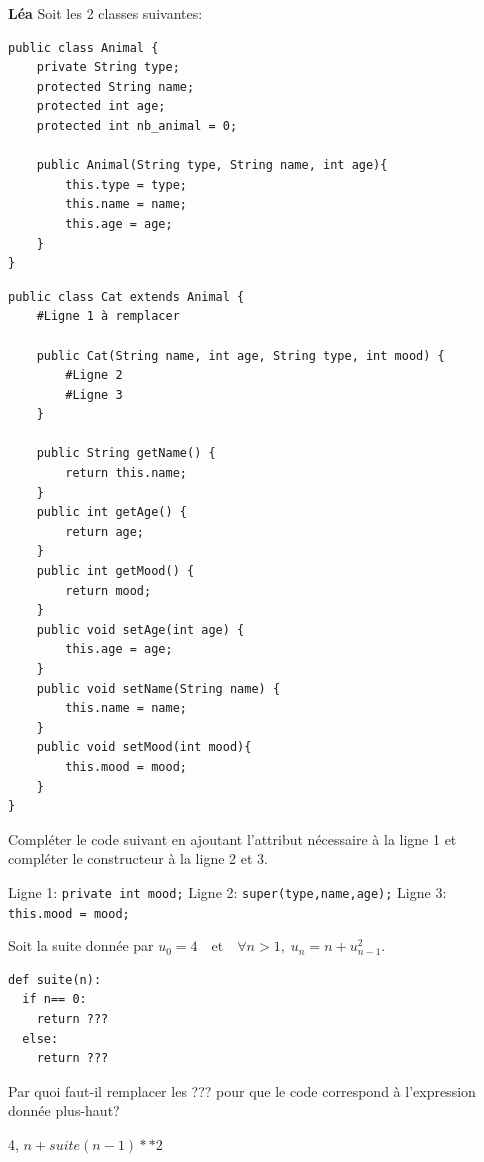 \begin{Exercice}[5 minutes]\textbf{Léa}
Soit les 2 classes suivantes:

\begin{lstlisting}[style=javastyle]
public class Animal {
    private String type;
    protected String name;
    protected int age;
    protected int nb_animal = 0;

    public Animal(String type, String name, int age){
        this.type = type;
        this.name = name;
        this.age = age;
    }
}
\end{lstlisting}

\begin{lstlisting}[style=javastyle]
public class Cat extends Animal {
    #Ligne 1 à remplacer

    public Cat(String name, int age, String type, int mood) {
        #Ligne 2
        #Ligne 3
    }

    public String getName() {
        return this.name;
    }
    public int getAge() {
        return age;
    }
    public int getMood() {
        return mood;
    }
    public void setAge(int age) {
        this.age = age;
    }
    public void setName(String name) {
        this.name = name;
    }
    public void setMood(int mood){
        this.mood = mood;
    }
}
\end{lstlisting}

Compléter le code suivant en ajoutant l'attribut nécessaire à la ligne 1 et compléter le constructeur à la ligne 2 et 3.

\begin{solution}
Ligne 1: \texttt{private int mood;} \newline 
Ligne 2: \texttt{super(type,name,age);} \newline 
Ligne 3: \texttt{this.mood = mood;}
\end{solution}


Soit la suite donnée par $u_0 = 4 \quad \text{et} \quad \forall n > 1,\; u_n = n + u_{n-1}^2$.

\begin{lstlisting}[style=pythonstyle]
def suite(n):
  if n== 0:
    return ???
  else:
    return ???
\end{lstlisting}

Par quoi faut-il remplacer les ??? pour que le code correspond à l'expression donnée plus-haut?


\begin{solution}
4, $n + suite(n-1)**2$
\end{solution}

\end{Exercice}


